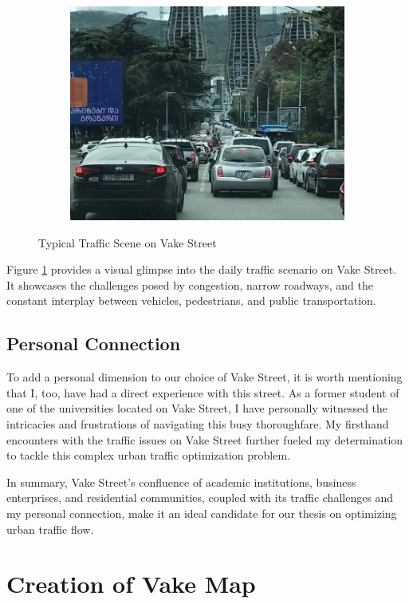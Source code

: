 \begin{figure}[h]
\begin{subfigure}{0.45\textwidth}
        \includegraphics[width=\linewidth]{images/methodology/vake-traffic-2.jpg}
    \end{subfigure}
    \caption{Typical Traffic Scene on Vake Street}
    \label{fig:vake-real-traffic}
\end{figure}

Figure \ref{fig:vake-real-traffic} provides a visual glimpse into the daily traffic scenario on Vake Street. It showcases the challenges posed by congestion, narrow roadways, and the constant interplay between vehicles, pedestrians, and public transportation.

\subsection{Personal Connection}
To add a personal dimension to our choice of Vake Street, it is worth mentioning that I, too, have had a direct experience with this street. As a former student of one of the universities located on Vake Street, I have personally witnessed the intricacies and frustrations of navigating this busy thoroughfare. My firsthand encounters with the traffic issues on Vake Street further fueled my determination to tackle this complex urban traffic optimization problem.

In summary, Vake Street's confluence of academic institutions, business enterprises, and residential communities, coupled with its traffic challenges and my personal connection, make it an ideal candidate for our thesis on optimizing urban traffic flow.

\section{Creation of Vake Map} \label{sec:map-creation}

